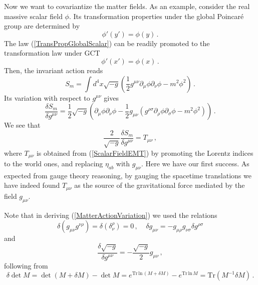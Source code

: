 \documentclass[12pt]{article}
\begin{document}
Now we want to covariantize the matter fields. As an example, consider the real massive scalar field $\phi$. Its transformation properties under the global Poincar\'e group are determined by
\begin{equation}\label{TransPropGlobalScalar}
\phi'(y')=\phi(y) \,.
\end{equation}
The law (\ref{TransPropGlobalScalar}) can be readily promoted to the transformation law under GCT
\begin{equation}
\phi'(x')=\phi(x) \,.
\end{equation}
Then, the invariant action reads
\begin{equation}
S_m=\int d^4x\sqrt{-g}\left(\dfrac{1}{2}g^{\mu\nu}\partial_\mu\phi\partial_\nu\phi-m^2\phi^2\right) \,.
\end{equation}
Its variation with respect to $g^{\mu\nu}$ gives
\begin{equation}\label{MatterActionVariation}
\dfrac{\delta S_m}{\delta g^{\mu\nu}}=\dfrac{1}{2}\sqrt{-g}\left(\partial_\mu\phi\partial_\nu\phi-\dfrac{1}{2}g_{\mu\nu}(g^{\rho\sigma}\partial_\rho\phi\partial_\sigma\phi-m^2\phi^2)\right) \,.
\end{equation}
We see that
\begin{equation}
\dfrac{2}{\sqrt{-g}}\dfrac{\delta S_m}{\delta g^{\mu\nu}}=T_{\mu\nu} \,,
\end{equation}
where $T_{\mu\nu}$ is obtained from (\ref{ScalarFieldEMT}) by promoting the Lorentz indices to the world ones, and replacing $\eta_{ab}$ with $g_{\mu\nu}$. Here we have our first success. As expected from gauge theory reasoning, by gauging the spacetime translations we have indeed found  $T_{\mu\nu}$ as the source of the gravitational force mediated by the field $g_{\mu\nu}$.

Note that in deriving (\ref{MatterActionVariation}) we used the relations
\begin{equation}
\delta(g_{\mu\nu}g^{\nu\rho})=\delta(\delta^\rho_\nu)=0 \,,~~~~~ \delta g_{\mu\nu}=-g_{\mu\rho}g_{\nu\sigma}\delta g^{\rho\sigma}
\end{equation}
and
\begin{equation}
\dfrac{\delta\sqrt{-g}}{\delta g^{\mu\nu}}=-\dfrac{\sqrt{-g}}{2}g_{\mu\nu} \,,
\end{equation}
following from
\begin{equation}
\delta\det M=\det(M+\delta M)-\det M=e^{\text{Tr}\,\text{ln}\, (M+\delta M)}-e^{\text{Tr}\,\text{ln}\,  M}=\text{Tr}(M^{-1}\delta M) \,.
\end{equation}
\end{document}

